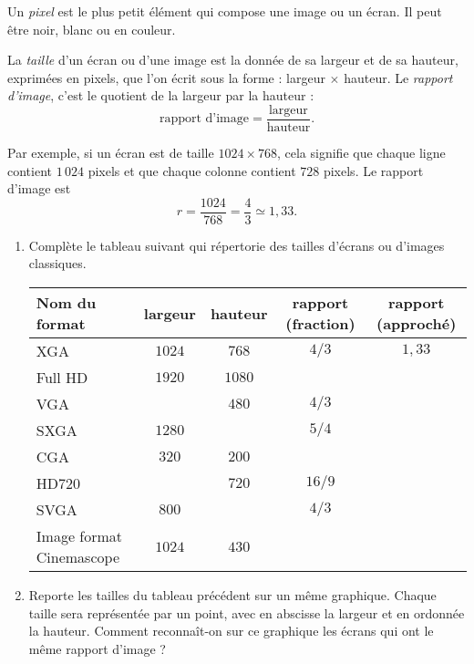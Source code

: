 \documentclass[class=report,crop=false, 12pt]{standalone}
\begin{document}

Un \emph{pixel} est le plus petit élément qui compose une image ou un écran. Il peut être noir, blanc ou en couleur.

\bigskip
\bigskip

\begin{activite}
La \emph{taille} d'un écran ou d'une image est la donnée de sa largeur et de sa hauteur, exprimées en pixels, que l'on écrit sous la forme : largeur $\times$ hauteur. Le \emph{rapport d'image}, c'est le quotient de la largeur par la hauteur :
$$\text{rapport d'image} = \frac{\text{largeur}}{\text{hauteur}}.$$

Par exemple, si un écran est de taille $1024 \times 768$, cela signifie que chaque ligne contient $1\,024$ pixels et que chaque colonne contient $728$ pixels. Le rapport d'image est
$$r = \frac{1024}{768} = \frac{4}{3} \simeq 1,33.$$



\begin{enumerate}
   \item Complète le tableau suivant qui répertorie  des tailles d'écrans ou d'images classiques.
   
   
\begin{tabular}{|l|c|c|c|c|} 
\hline
Nom du format & largeur & hauteur & rapport (fraction) & rapport (approché) \\ \hline \hline
XGA & $1024$ & $768$ & $4/3$ & $1,33$ \\ \hline
Full HD & $1920$ & $1080$ & & \\ \hline
VGA &  & $480$ & $4/3$ & \\ \hline
SXGA & $1280$ & & $5/4$ & \\ \hline 
CGA & $320$ & $200$ & & \\ \hline
HD720 & & $720$ & $16/9$ & \\ \hline 
SVGA & $800$ & & $4/3$ &  \\ \hline
Image format Cinemascope & $1024$ & $430$ & & \\ \hline  
\end{tabular}
 
 
\item Reporte les tailles du tableau précédent sur un même graphique. Chaque taille sera représentée par un point, avec en abscisse la largeur et en ordonnée la hauteur. 
Comment reconnaît-on sur ce graphique les écrans qui ont le même rapport d'image ?


\end{enumerate}

\end{activite}
\end{document}
